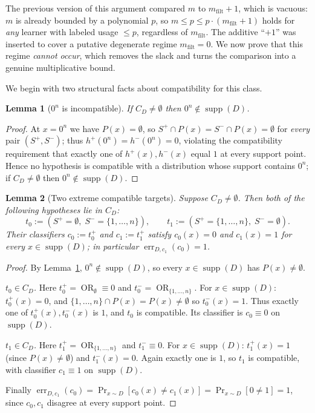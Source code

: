 \documentclass{amsart}
\newtheorem{lemma}{Lemma}
\theoremstyle{definition}
\DeclareMathOperator{\supp}{supp}
\DeclareMathOperator{\err}{err}
\DeclareMathOperator*{\OR}{OR}
\begin{document}
The previous version of this argument compared $m$ to $m_{\mathrm{filt}}+1$,
which is vacuous: $m$ is already bounded by a polynomial $p$, so $m\le
p\le p\cdot(m_{\mathrm{filt}}+1)$ holds for \emph{any} learner with labeled usage
$\le p$, regardless of $m_{\mathrm{filt}}$. The additive ``$+1$'' was inserted to
cover a putative degenerate regime $m_{\mathrm{filt}}=0$. We now prove that this
regime \emph{cannot occur}, which removes the slack and turns the comparison into
a genuine multiplicative bound.

We begin with two structural facts about compatibility for this class.

\begin{lemma}[$0^n$ is incompatible]\label{lem:zero}
If $C_D\neq\emptyset$ then $0^n\notin\supp(D)$.
\end{lemma}

\begin{proof}
At $x=0^n$ we have $P(x)=\emptyset$, so $S^+\cap P(x)=S^-\cap P(x)=\emptyset$ for
\emph{every} pair $(S^+,S^-)$; thus $h^+(0^n)=h^-(0^n)=0$, violating the
compatibility requirement that exactly one of $h^+(x),h^-(x)$ equal $1$ at every
support point. Hence no hypothesis is compatible with a distribution whose
support contains $0^n$; if $C_D\neq\emptyset$ then $0^n\notin\supp(D)$.
\end{proof}

\begin{lemma}[Two extreme compatible targets]\label{lem:extreme}
Suppose $C_D\neq\emptyset$. Then both of the following hypotheses lie in $C_D$:
\[
  t_0:=(S^+=\emptyset,\;S^-=\{1,\dots,n\}),\qquad
  t_1:=(S^+=\{1,\dots,n\},\;S^-=\emptyset).
\]
Their classifiers $c_0:=t_0^{+}$ and $c_1:=t_1^{+}$ satisfy $c_0(x)=0$ and
$c_1(x)=1$ for every $x\in\supp(D)$; in particular $\err_{D,c_1}(c_0)=1$.
\end{lemma}

\begin{proof}
By Lemma~\ref{lem:zero}, $0^n\notin\supp(D)$, so every $x\in\supp(D)$ has
$P(x)\neq\emptyset$.

\emph{$t_0\in C_D$.} Here $t_0^+=\OR_{\emptyset}\equiv0$ and
$t_0^-=\OR_{\{1,\dots,n\}}$. For $x\in\supp(D)$: $t_0^+(x)=0$, and
$\{1,\dots,n\}\cap P(x)=P(x)\neq\emptyset$ so $t_0^-(x)=1$. Thus exactly one of
$t_0^+(x),t_0^-(x)$ is $1$, and $t_0$ is compatible. Its classifier is $c_0\equiv0$
on $\supp(D)$.

\emph{$t_1\in C_D$.} Here $t_1^+=\OR_{\{1,\dots,n\}}$ and $t_1^-\equiv0$. For
$x\in\supp(D)$: $t_1^+(x)=1$ (since $P(x)\neq\emptyset$) and $t_1^-(x)=0$. Again
exactly one is $1$, so $t_1$ is compatible, with classifier $c_1\equiv1$ on
$\supp(D)$.

Finally $\err_{D,c_1}(c_0)=\Pr_{x\sim D}[c_0(x)\neq c_1(x)]=\Pr_{x\sim
D}[0\neq1]=1$, since $c_0,c_1$ disagree at every support point.
\end{proof}
\end{document}
